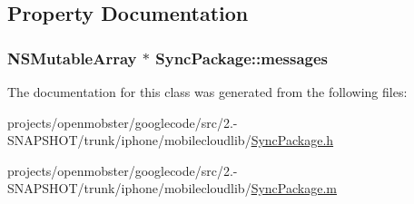 \subsection{\-Property \-Documentation}
\hypertarget{interface_sync_package_abad6a6fc70f5fe4bdf8a4d60f0b36816}{
\subsubsection[{messages}]{\setlength{\rightskip}{0pt plus 5cm}\-N\-S\-Mutable\-Array $\ast$ \-Sync\-Package\-::messages}}
\label{interface_sync_package_abad6a6fc70f5fe4bdf8a4d60f0b36816}


\-The documentation for this class was generated from the following files\-:\begin{DoxyCompactItemize}
\item 
projects/openmobster/googlecode/src/2.-\/\-S\-N\-A\-P\-S\-H\-O\-T/trunk/iphone/mobilecloudlib/\hyperlink{_sync_package_8h}{\-Sync\-Package.\-h}\item 
projects/openmobster/googlecode/src/2.-\/\-S\-N\-A\-P\-S\-H\-O\-T/trunk/iphone/mobilecloudlib/\hyperlink{_sync_package_8m}{\-Sync\-Package.\-m}\end{DoxyCompactItemize}
